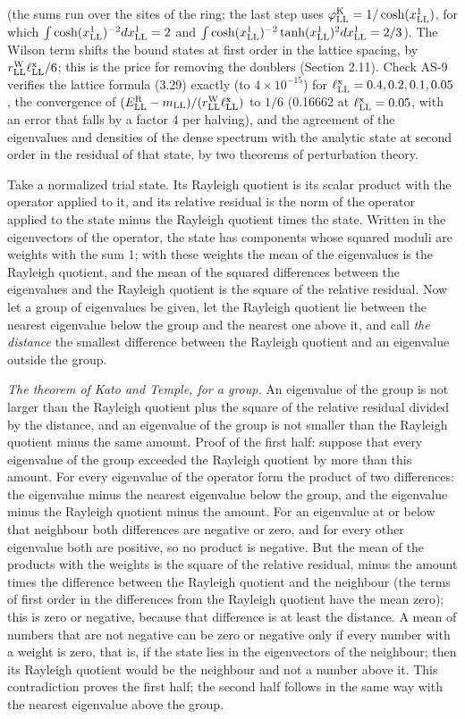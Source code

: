 \documentclass[
  10pt,
]{article}
\begin{document}
(the sums run over the sites of the ring; the last step uses
\(\varphi^{\rm K}_{\rm LL}=1/\cosh(x^1_{\rm LL})\), for which
\(\int\cosh(x^1_{\rm LL})^{-2}dx^1_{\rm LL}=2\) and
\(\int\cosh(x^1_{\rm LL})^{-2}\tanh(x^1_{\rm LL})^2dx^1_{\rm LL}=2/3\)).
The Wilson term shifts the bound states at first order in the lattice
spacing, by \(r^{\rm W}_{\rm LL}\ell^{\rm x}_{\rm LL}/6\); this is the
price for removing the doublers (Section 2.11). Check AS-9 verifies the
lattice formula (3.29) exactly (to \(4\times10^{-15}\)) for
\(\ell^{\rm x}_{\rm LL}=0.4,0.2,0.1,0.05\), the convergence of
\((E^{\rm R}_{\rm LL}-m_{\rm LL})/(r^{\rm W}_{\rm LL}\ell^{\rm x}_{\rm LL})\)
to \(1/6\) (0.16662 at \(\ell^{\rm x}_{\rm LL}=0.05\), with an error
that falls by a factor 4 per halving), and the agreement of the
eigenvalues and densities of the dense spectrum with the analytic state
at second order in the residual of that state, by two theorems of
perturbation theory.

Take a normalized trial state. Its Rayleigh quotient is its scalar
product with the operator applied to it, and its relative residual is
the norm of the operator applied to the state minus the Rayleigh
quotient times the state. Written in the eigenvectors of the operator,
the state has components whose squared moduli are weights with the sum
1; with these weights the mean of the eigenvalues is the Rayleigh
quotient, and the mean of the squared differences between the
eigenvalues and the Rayleigh quotient is the square of the relative
residual. Now let a group of eigenvalues be given, let the Rayleigh
quotient lie between the nearest eigenvalue below the group and the
nearest one above it, and call \emph{the distance} the smallest
difference between the Rayleigh quotient and an eigenvalue outside the
group.

\emph{The theorem of Kato and Temple, for a group.} An eigenvalue of the
group is not larger than the Rayleigh quotient plus the square of the
relative residual divided by the distance, and an eigenvalue of the
group is not smaller than the Rayleigh quotient minus the same amount.
Proof of the first half: suppose that every eigenvalue of the group
exceeded the Rayleigh quotient by more than this amount. For every
eigenvalue of the operator form the product of two differences: the
eigenvalue minus the nearest eigenvalue below the group, and the
eigenvalue minus the Rayleigh quotient minus the amount. For an
eigenvalue at or below that neighbour both differences are negative or
zero, and for every other eigenvalue both are positive, so no product is
negative. But the mean of the products with the weights is the square of
the relative residual, minus the amount times the difference between the
Rayleigh quotient and the neighbour (the terms of first order in the
differences from the Rayleigh quotient have the mean zero); this is zero
or negative, because that difference is at least the distance. A mean of
numbers that are not negative can be zero or negative only if every
number with a weight is zero, that is, if the state lies in the
eigenvectors of the neighbour; then its Rayleigh quotient would be the
neighbour and not a number above it. This contradiction proves the first
half; the second half follows in the same way with the nearest
eigenvalue above the group.
\end{document}
